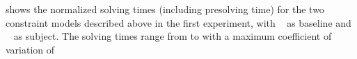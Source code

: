 \renewcommand{\thefigure}{\oldthefigure}

 shows the normalized
solving times (including \gls{presolving} time) for the two \glspl{constraint
  model} described above in the first experiment, with ~ as \gls{baseline} and
~ as \gls{subject}.
%
The solving times range from
\printMinSolvingTime{
  \SolvTechDisableImplConsDefsDominateDefsPrePlusSolvingTimeSpeedupAllPrePlusSolvingTimeAvgMin,
  \SolvTechDisableImplConsDefsDominateDefsPrePlusSolvingTimeSpeedupPrePlusSolvingTimeAvgMin,
  \SolvTechDisableImplConsDefsInSpannedBlocksPrePlusSolvingTimeSpeedupPrePlusSolvingTimeAvgMin,
  \SolvTechDisableImplConsIdenticalEntryBlocksPrePlusSolvingTimeSpeedupPrePlusSolvingTimeAvgMin,
  \SolvTechDisableImplConsDefsDominateEntryBlocksPrePlusSolvingTimeSpeedupPrePlusSolvingTimeAvgMin,
  \SolvTechDisableImplConsPlacePhiOpsSameAsDefEdgesPrePlusSolvingTimeSpeedupPrePlusSolvingTimeAvgMin,
  \SolvTechDisableImplConsNoSpanUsesPrePlusSolvingTimeSpeedupPrePlusSolvingTimeAvgMin,
  \SolvTechDisableImplConsNoSpanDefsPrePlusSolvingTimeSpeedupPrePlusSolvingTimeAvgMin,
  \SolvTechDisableImplConsNoSpanUseDefsPrePlusSolvingTimeSpeedupPrePlusSolvingTimeAvgMin,
  \SolvTechDisableImplConsSpannedInputPrePlusSolvingTimeSpeedupPrePlusSolvingTimeAvgMin,
  \SolvTechDisableImplConsUsedDataMustBeAvailablePrePlusSolvingTimeSpeedupPrePlusSolvingTimeAvgMin,
  \SolvTechDisableImplConsExteriorDataMustBeAvailablePrePlusSolvingTimeSpeedupPrePlusSolvingTimeAvgMin,
  \SolvTechDisableImplConsLocsOfUsesPrePlusSolvingTimeSpeedupPrePlusSolvingTimeAvgMin,
  \SolvTechDisableImplConsLocsOfDefsPrePlusSolvingTimeSpeedupPrePlusSolvingTimeAvgMin,
  \SolvTechDisableImplConsFixFallThroughsPrePlusSolvingTimeSpeedupPrePlusSolvingTimeAvgMin
} to
\printMaxSolvingTime{
  \SolvTechDisableImplConsDefsDominateDefsPrePlusSolvingTimeSpeedupAllPrePlusSolvingTimeAvgMax,
  \SolvTechDisableImplConsDefsDominateDefsPrePlusSolvingTimeSpeedupPrePlusSolvingTimeAvgMax,
  \SolvTechDisableImplConsDefsInSpannedBlocksPrePlusSolvingTimeSpeedupPrePlusSolvingTimeAvgMax,
  \SolvTechDisableImplConsIdenticalEntryBlocksPrePlusSolvingTimeSpeedupPrePlusSolvingTimeAvgMax,
  \SolvTechDisableImplConsDefsDominateEntryBlocksPrePlusSolvingTimeSpeedupPrePlusSolvingTimeAvgMax,
  \SolvTechDisableImplConsPlacePhiOpsSameAsDefEdgesPrePlusSolvingTimeSpeedupPrePlusSolvingTimeAvgMax,
  \SolvTechDisableImplConsNoSpanUsesPrePlusSolvingTimeSpeedupPrePlusSolvingTimeAvgMax,
  \SolvTechDisableImplConsNoSpanDefsPrePlusSolvingTimeSpeedupPrePlusSolvingTimeAvgMax,
  \SolvTechDisableImplConsNoSpanUseDefsPrePlusSolvingTimeSpeedupPrePlusSolvingTimeAvgMax,
  \SolvTechDisableImplConsSpannedInputPrePlusSolvingTimeSpeedupPrePlusSolvingTimeAvgMax,
  \SolvTechDisableImplConsUsedDataMustBeAvailablePrePlusSolvingTimeSpeedupPrePlusSolvingTimeAvgMax,
  \SolvTechDisableImplConsExteriorDataMustBeAvailablePrePlusSolvingTimeSpeedupPrePlusSolvingTimeAvgMax,
  \SolvTechDisableImplConsLocsOfUsesPrePlusSolvingTimeSpeedupPrePlusSolvingTimeAvgMax,
  \SolvTechDisableImplConsLocsOfDefsPrePlusSolvingTimeSpeedupPrePlusSolvingTimeAvgMax,
  \SolvTechDisableImplConsFixFallThroughsPrePlusSolvingTimeSpeedupPrePlusSolvingTimeAvgMax
} with a maximum coefficient of variation of
